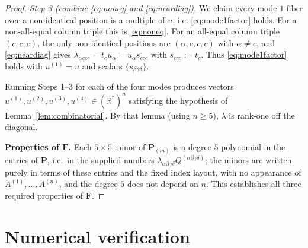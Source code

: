 \documentclass[12pt]{article}
\newcommand{\bR}{\mathbb{R}}
\theoremstyle{definition}
\begin{document}
\begin{proof}
\emph{Step 3 (combine \eqref{eq:noneq} and \eqref{eq:neardiag}).}  We claim every
mode-$1$ fiber over a non-identical position is a multiple of $u$, i.e.
\eqref{eq:mode1factor} holds.  For a non-all-equal column triple this is
\eqref{eq:noneq}.  For an all-equal column triple $(c,c,c)$, the only non-identical
positions are $(\alpha,c,c,c)$ with $\alpha\ne c$, and \eqref{eq:neardiag} gives
$\lambda_{\alpha ccc}=t_c u_\alpha=u_\alpha s_{ccc}$ with $s_{ccc}:=t_c$.  Thus
\eqref{eq:mode1factor} holds with $u^{(1)}=u$ and scalars
$\{s_{\beta\gamma\delta}\}$.

Running Steps 1--3 for each of the four modes produces vectors
$u^{(1)},u^{(2)},u^{(3)},u^{(4)}\in(\bR^*)^n$ satisfying the hypothesis of
Lemma~\ref{lem:combinatorial}.  By that lemma (using $n\ge5$), $\lambda$ is rank-one
off the diagonal.

\textbf{Properties of $\mathbf F$.}  Each $5\times5$ minor of $\mathbf P_{(m)}$ is a
degree-$5$ polynomial in the entries of $\mathbf P$, i.e.\ in the supplied numbers
$\lambda_{\alpha\beta\gamma\delta}Q^{(\alpha\beta\gamma\delta)}$; the minors are
written purely in terms of these entries and the fixed index layout, with no
appearance of $A^{(1)},\dots,A^{(n)}$, and the degree $5$ does not depend on $n$.
This establishes all three required properties of $\mathbf F$.
\end{proof}

\section{Numerical verification}\label{sec:num}
\end{document}
